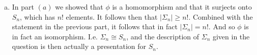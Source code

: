 \documentclass[12pt,letterpaper,boxed]{hmcpset}
\newcommand{\abs}[1]{\left|#1\right|}
\begin{document}
\begin{solution}
\begin{enumerate}[(a)]
\item In part $(a)$ we showed that $\phi$ is a homomorphism and that
it surjects onto $S_n$, which has $n!$ elements. It follows then that
$\abs{\Sigma_n} \geq n!$. Combined with the statement in the previous
part, it follows that in fact $\abs{\Sigma_n} = n!$. And so $\phi$ is
in fact an isomorphism. I.e. $\Sigma_n \cong S_n$, and the description
of $\Sigma_n$ given in the question is then actually a presentation
for $S_n$. 

\end{enumerate}
\end{solution}

\newpage
\end{document}
